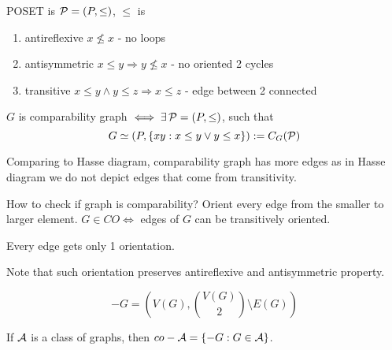\begin{definition}
	POSET is $\operatorname{\mathcal{P}} = (P, \leq)$, $\leq$ is
	\begin{enumerate}
		\item antireflexive $x \not \leq x$ - no loops
		\item antisymmetric $x \leq y \Rightarrow y \not \leq x$ - no oriented 2 cycles
		\item transitive $x \leq y \land y \leq z \Rightarrow x \leq z$ - edge between 2 connected
	\end{enumerate}

	$G$ is comparability graph $\iff \exists \operatorname{\mathcal{P}} = (P, \leq)$, such that
	\[ G \simeq (P, \{ xy: x\leq y \lor y \leq x \}) := C_G(\operatorname{\mathcal{P}}) \]

	Comparing to Hasse diagram, comparability graph has more edges as in Hasse diagram we do not depict edges that come from transitivity.
\end{definition}

\begin{observation}
	How to check if graph is comparability?
	Orient every edge from the smaller to larger element.
	$G \in CO \iff$ edges of $G$ can be transitively oriented.

	Every edge gets only 1 orientation.

	Note that such orientation preserves antireflexive and antisymmetric property.
\end{observation}

\begin{notation}
	\[ -G = \left(V(G), \binom{V(G)}{2} \setminus E(G)\right) \]

	If $\operatorname{\mathcal{A}}$ is a class of graphs, then $co-\operatorname{\mathcal{A}} = \{ -G: G \in \operatorname{\mathcal{A}} \}$.
\end{notation}

